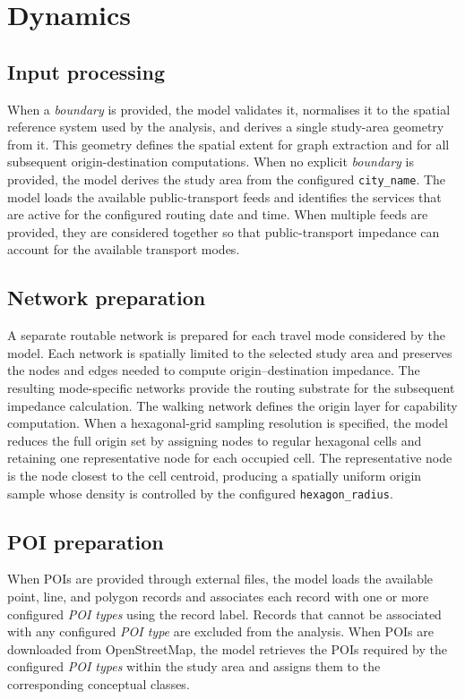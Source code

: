 \documentclass{article}
\begin{document}
\section{Dynamics}
\subsection{Input processing}
When a \emph{boundary} is provided, the model validates it, normalises it to the spatial reference system used by the analysis, and derives a single study-area geometry from it. This geometry defines the spatial extent for graph extraction and for all subsequent origin-destination computations. When no explicit \emph{boundary} is provided, the model derives the study area from the configured \texttt{city\_name}. The model loads the available public-transport feeds and identifies the services that are active for the configured routing date and time. When multiple feeds are provided, they are considered together so that public-transport impedance can account for the available transport modes.

\subsection{Network preparation}
A separate routable network is prepared for each travel mode considered by the model. Each network is spatially limited to the selected study area and preserves the nodes and edges needed to compute origin--destination impedance. The resulting mode-specific networks provide the routing substrate for the subsequent impedance calculation. The walking network defines the origin layer for capability computation. When a hexagonal-grid sampling resolution is specified, the model reduces the full origin set by assigning nodes to regular hexagonal cells and retaining one representative node for each occupied cell. The representative node is the node closest to the cell centroid, producing a spatially uniform origin sample whose density is controlled by the configured \texttt{hexagon\_radius}.

\subsection{POI preparation}
When POIs are provided through external files, the model loads the available point, line, and polygon records and associates each record with one or more configured \emph{POI types} using the record label. Records that cannot be associated with any configured \emph{POI type} are excluded from the analysis. When POIs are downloaded from OpenStreetMap, the model retrieves the POIs required by the configured \emph{POI types} within the study area and assigns them to the corresponding conceptual classes.
\end{document}
